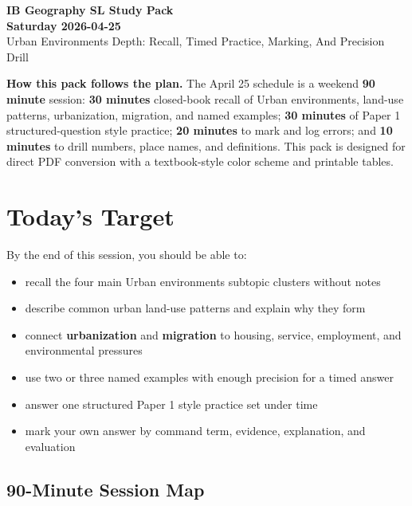 \documentclass[11pt,a4paper]{article}
\newcommand{\term}[1]{\textcolor{HeadingBlue}{\textbf{#1}}}
\newcommand{\boxnote}[3]{%
\noindent\colorbox{#1}{%
  \begin{minipage}{0.965\textwidth}
  \sffamily
  \textbf{\textcolor{HeadingBlue}{#2}} #3
  \end{minipage}
}}
\begin{document}
\begin{center}
  {\sffamily\bfseries\color{HeadingBlue}\LARGE IB Geography SL Study Pack}\\[0.25em]
  {\sffamily\bfseries\color{AccentTeal}\Large Saturday 2026-04-25}\\[0.35em]
  {\sffamily\color{TextInk}Urban Environments Depth: Recall, Timed Practice, Marking, And Precision Drill}
\end{center}

\vspace{0.5em}

\boxnote{SoftBlue}{How this pack follows the plan.}{The April 25 schedule is a
weekend \term{90 minute} session: \term{30 minutes} closed-book recall of Urban
environments, land-use patterns, urbanization, migration, and named examples;
\term{30 minutes} of Paper 1 structured-question style practice;
\term{20 minutes} to mark and log errors; and \term{10 minutes} to drill
numbers, place names, and definitions. This pack is designed for direct PDF
conversion with a textbook-style color scheme and printable tables.}

\section{Today's Target}

By the end of this session, you should be able to:

\begin{itemize}
  \item recall the four main Urban environments subtopic clusters without notes
  \item describe common urban land-use patterns and explain why they form
  \item connect \term{urbanization} and \term{migration} to housing, service,
  employment, and environmental pressures
  \item use two or three named examples with enough precision for a timed answer
  \item answer one structured Paper 1 style practice set under time
  \item mark your own answer by command term, evidence, explanation, and
  evaluation
\end{itemize}

\subsection{90-Minute Session Map}
\end{document}
